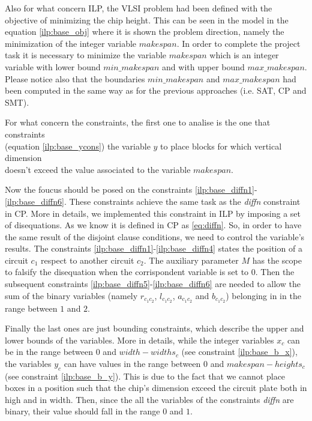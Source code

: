    Also for what concern ILP, the VLSI problem had been defined with the objective of minimizing 
    the chip height. This can be seen in the model in the equation \ref{ilp:base_obj} where it is
    shown the problem direction, namely the minimization of the integer variable $makespan$.
    In order to complete the project task it is necessary to minimize the variable $makespan$ which
    is an integer variable with lower bound $min\_makespan$ and with upper bound $max\_makespan$.
    Please notice also that the  boundaries $min\_makespan$ and $max\_makespan$ had been computed
    in the same way as for the previous approaches (i.e. SAT, CP and SMT).

    For what concern the constraints, the first one to analise is the one that constraints \\
    (equation \ref{ilp:base_ycons}) the variable $y$ to place blocks for which vertical dimension\\
    doesn't exceed the value associated to the variable $makespan$.

    Now the foucus should be posed on the constraints \ref{ilp:base_diffn1}-\ref{ilp:base_diffn6}.
    These constraints achieve the same task as the \textit{diffn} constraint in CP. More in
    details, we implemented this constraint in ILP by imposing a set of disequations. As we know
    it is defined in CP as \ref{eq:diffn}. So, in order to have the same result of the disjoint
    clause conditions, we need to control the variable's results. The constraints 
    \ref{ilp:base_diffn1}-\ref{ilp:base_diffn4} states the position of a circuit $c_1$ respect to
    another circuit $c_2$. The auxiliary parameter $M$ has the scope to falsify the disequation
    when the corrispondent variable is set to 0. Then the subsequent constraints 
    \ref{ilp:base_diffn5}-\ref{ilp:base_diffn6} are needed to allow the sum of the binary variables 
    (namely $r_{c_1c_2}$, $l_{c_1c_2}$, $a_{c_1c_2}$ and $b_{c_1c_2}$) belonging in in the range
    between $1$ and $2$. 
    
    Finally the last ones are just bounding constraints, which describe the upper and lower bounds
    of the variables. More in details, while the integer variables $x_c$ can be in the range 
    between $0$ and $width-widths_c$ (see constraint \ref{ilp:base_b_x}), the variables $y_c$ can have
    values in the range between $0$ and $makespan-heights_c$ (see constraint \ref{ilp:base_b_y}). 
    This is due to the fact that we cannot place boxes in a position such that the chip's dimension 
    exceed the circuit plate both in high and in width. Then, since the all the variables of the 
    constraints \textit{diffn} are binary, their value should fall in the range $0$ and $1$.

